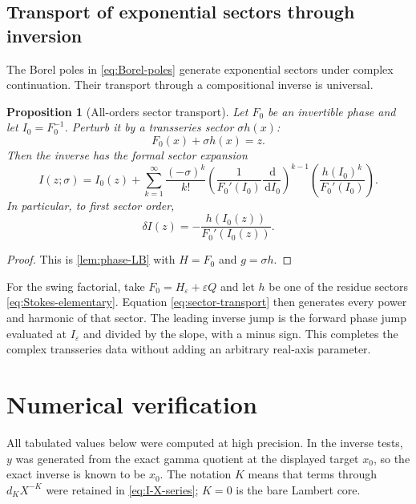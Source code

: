 \documentclass[11pt]{article}
\newtheorem{proposition}[theorem]{Proposition}
\theoremstyle{definition}
\theoremstyle{remark}
\newcommand{\eps}{\varepsilon}
\newcommand{\dd}{\,\mathrm d}
\begin{document}
\subsection{Transport of exponential sectors through inversion}

The Borel poles in \eqref{eq:Borel-poles} generate exponential sectors under complex continuation.  Their transport through a compositional inverse is universal.

\begin{proposition}[All-orders sector transport]\label{prop:sector-transport}
Let $F_0$ be an invertible phase and let $I_0=F_0^{-1}$.  Perturb it by a transseries sector $\sigma h(x)$:
\[
 F_0(x)+\sigma h(x)=z.
\]
Then the inverse has the formal sector expansion
\begin{equation}\label{eq:sector-transport}
 I(z;\sigma)=I_0(z)+\sum_{k=1}^\infty\frac{(-\sigma)^k}{k!}
 \left(\frac1{F_0'(I_0)}\frac{\dd}{\dd I_0}\right)^{k-1}
 \left(\frac{h(I_0)^k}{F_0'(I_0)}\right).
\end{equation}
In particular, to first sector order,
\begin{equation}\label{eq:sector-leading}
 \delta I(z)=-\frac{h(I_0(z))}{F_0'(I_0(z))}.
\end{equation}
\end{proposition}

\begin{proof}
This is \cref{lem:phase-LB} with $H=F_0$ and $g=\sigma h$.
\end{proof}

For the swing factorial, take $F_0=H_\eps+\eps Q$ and let $h$ be one of the residue sectors \eqref{eq:Stokes-elementary}.  Equation \eqref{eq:sector-transport} then generates every power and harmonic of that sector.  The leading inverse jump is the forward phase jump evaluated at $I_\eps$ and divided by the slope, with a minus sign.  This completes the complex transseries data without adding an arbitrary real-axis parameter.

\section{Numerical verification}

All tabulated values below were computed at high precision.  In the inverse tests, $y$ was generated from the exact gamma quotient at the displayed target $x_0$, so the exact inverse is known to be $x_0$.  The notation $K$ means that terms through $d_KX^{-K}$ were retained in \eqref{eq:I-X-series}; $K=0$ is the bare Lambert core.
\end{document}
